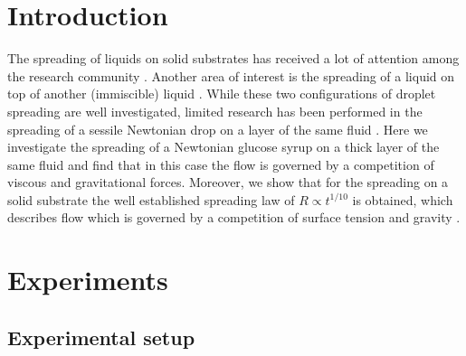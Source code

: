 \documentclass[aip,graphicx]{revtex4-1}
\begin{document}
\pacs{}%

\maketitle %

\section{Introduction}
\label{sec:introduction}

The spreading of liquids on solid substrates has received a lot of attention among the research community \cite{de1985wetting, bonn2009wetting}.
Another area of interest is the spreading of a liquid on top of another (immiscible) liquid \cite{fraaije1989dynamics, joos1977spreading}.
While these two configurations of droplet spreading are well investigated, limited research has been performed in the spreading of a sessile Newtonian drop on a layer of the same fluid \cite{tanner1979spreading, cormier2012beyond, chebbi1999capillary}.
Here we investigate the spreading of a Newtonian glucose syrup on a thick layer of the same fluid and find that in this case the flow is governed by a competition of viscous and gravitational forces.
Moreover, we show that for the spreading on a solid substrate the well established spreading law of $R \propto t^{1/10}$ is obtained, which describes flow which is governed by a competition of surface tension and gravity \cite{bonn2009wetting}.

\section{Experiments}
\label{sec:experiments}

\subsection{Experimental setup}
\end{document}
